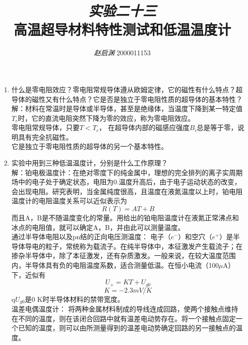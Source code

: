 \documentclass[a4paper,11pt]{article}
\title{\textit{\large 实验二十三}\\[2mm]
		\textbf{\LARGE 高温超导材料特性测试和低温温度计}}
\author{\textit{赵启渊} 2000011153}
\date{}
\begin{document}
	
	
\maketitle
\thispagestyle{fancy}
\begin{enumerate}
	\item 什么是零电阻效应？零电阻常规导体遵从欧姆定律，它的磁性有什么特点？超导体的磁性又有什么特点？它是否是独立于零电阻性质的超导体的基本特性？\\
	解：材料在常温时是导体或半导体，甚至是绝缘体，当温度下降到某一特定值$ T_c $时，它的直流电阻突然下降为零的效应，称为零电阻效应。\\
	零电阻常规导体，只要$ T < T_c $， 在超导体内部的磁感应强度$B_i$总是等于零，说明具有完全抗磁性。\\
	它是独立于零电阻性质的超导体的另一个基本特性。
	
	
	\item 实验中用到三种低温温度计，分别是什么工作原理？ \\
	解：铂电极温度计：在绝对零度下的纯金属中，理想的完全排列的离子实周期场中的电子处于确定状态，电阻为0.温度升高后，由于电子运动状态的改变，会出现电阻。研究表明，当金属纯度很高，且温度在液氮温度以上时，铂电阻温度计的电阻温度关系可以近似表示为$$ R(T) = AT + B $$而且A，B是不随温度变化的常量。用给出的铂电阻温度计在液氮正常沸点和冰点的电阻值，就可以确定A，B，并由此可以测量温度。\\
	通过半导体电阻以及pn结的正向电压测温度： 电子（$e^-$）和空穴（$e^+$）是半导体导电的粒子，常统称为载流子。在纯半导体中，本征激发产生载流子；在掺杂半导体中，除了本征激发，还有杂质激发。一般来说，在较大温度范围内，半导体具有负的电阻温度系数，适合测量低温。在恒小电流（100$\mu$A）下，近似有$$ U_+ = KT + U_{g0} $$
	$$ K = -2.3 mV/K $$
	q$U_{g0}$是0 K时半导体材料的禁带宽度。\\
	温差电偶温度计： 将两种金属材料制成的导线连成回路，使两个接触点维持在不同的温度，则在该闭合回路中就有温差电动势存在。将一个接触点固定一个已知的温度，则可以由所测量得到的温差电动势确定回路的另一接触点的温度。
	

\end{enumerate}
\end{document}
